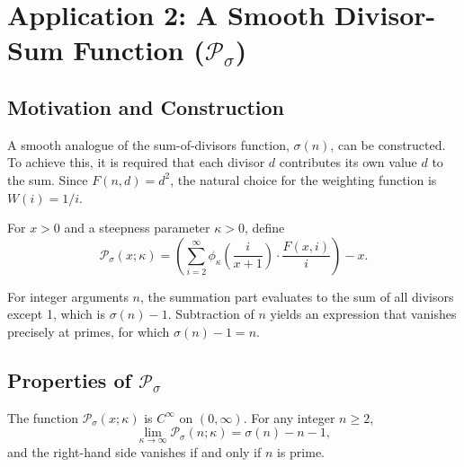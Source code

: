\section{Application 2: A Smooth Divisor-Sum Function (\texorpdfstring{$\mathcal{P}_{\sigma}$}{P_sigma})}

\subsection{Motivation and Construction}
A smooth analogue of the sum-of-divisors function, $\sigma(n)$, can be constructed.
To achieve this, it is required that each divisor $d$ contributes its own value $d$ to the sum.
Since $F(n,d)=d^2$, the natural choice for the weighting function is $W(i)=1/i$.
\begin{definition}
For $x>0$ and a steepness parameter $\kappa>0$, define
\begin{equation}\label{eq:Psigma}
\mathcal{P}_{\sigma}(x; \kappa) = \left( \sum_{i=2}^{\infty} \phi_{\kappa}\!\left(\frac{i}{x+1}\right) \cdot \frac{F(x,i)}{i} \right) - x.
\end{equation}
\end{definition}
For integer arguments $n$, the summation part evaluates to the sum of all divisors except 1, which is $\sigma(n)-1$. Subtraction of $n$ yields an expression that vanishes precisely at primes, for which $\sigma(n)-1=n$.
\subsection{Properties of $\mathcal{P}_{\sigma}$}

\begin{proposition}\label{prop:Psigma-properties}
The function $\mathcal{P}_{\sigma}(x;\kappa)$ is $C^\infty$ on $(0,\infty)$. For any integer $n\ge2$,
\[
\lim_{\kappa\to\infty} \mathcal{P}_{\sigma}(n; \kappa) = \sigma(n) - n - 1,
\]
and the right-hand side vanishes if and only if $n$ is prime.
\end{proposition}

